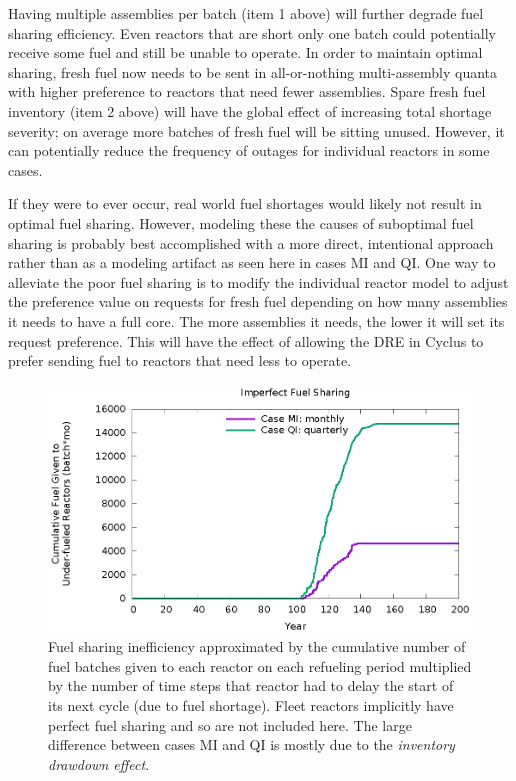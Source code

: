 \documentclass{style}
\begin{document}
Having multiple assemblies per batch (item 1 above) will further degrade fuel
sharing efficiency.  Even reactors that are short only one batch could
potentially receive some fuel and still be unable to operate.  In order to
maintain optimal sharing, fresh fuel now needs to be sent in all-or-nothing
multi-assembly quanta with higher preference to reactors that need fewer
assemblies.  Spare fresh fuel inventory (item 2 above) will have the global
effect of increasing total shortage severity; on average more batches of fresh
fuel will be sitting unused.  However, it can potentially reduce the frequency
of outages for individual reactors in some cases.

If they were to ever occur, real world fuel shortages would likely not result
in optimal fuel sharing. However, modeling these the causes of suboptimal fuel
sharing is probably best accomplished with a more direct, intentional approach
rather than as a modeling artifact as seen here in cases MI and QI.  One way to
alleviate the poor fuel sharing is to modify the individual reactor model to
adjust the preference value on requests for fresh fuel depending on how many
assemblies it needs to have a full core.  The more assemblies it needs, the
lower it will set its request preference.  This will have the effect of
allowing the DRE in Cyclus to prefer sending
fuel to reactors that need less to operate.

\begin{figure}[!h]
    \centering
    \includegraphics[width=1.0\columnwidth]{exp2/badshare.eps}
    \caption[Cumulative unnecessary idling fuel]{
        Fuel sharing inefficiency approximated by the cumulative number of
        fuel batches given to each reactor on each refueling period multiplied
        by the number of time steps that reactor had to delay the start of its
        next cycle (due to fuel shortage).  Fleet reactors implicitly have perfect fuel
        sharing and so are not included here. The large difference
        between cases MI and QI is mostly due to the \emph{inventory drawdown
        effect}. 
    }
    \label{fig:badshare}
\end{figure}
\end{document}
